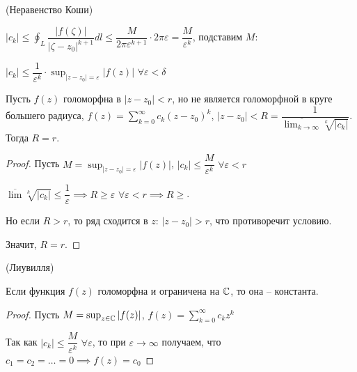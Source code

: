\begin{corollary}
    (Неравенство Коши)

    $|c_k| \leq \oint_{L} \dfrac{|f(\zeta)|}{|\zeta - z_0|^{k + 1}} dl \leq \dfrac{M}{2\pi\varepsilon^{k+1}} \cdot 2\pi\varepsilon = \dfrac{M}{\varepsilon^{k}}$, подставим $M$:

    $|c_k| \leq \dfrac{1}{\varepsilon^{k}} \cdot \sup_{|z - z_0| = \varepsilon} |f(z)|$  $\forall \varepsilon < \delta$
\end{corollary}

\begin{theorem*}
    Пусть $f(z)$ голоморфна в $|z - z_0| < r$, но не является голоморфной в круге большего радиуса, $f(z) = \sum_{k=0}^{\infty} c_k(z - z_0)^k$, $|z - z_0| < R = \dfrac{1}{\overline{\lim_{k \to \infty}} \sqrt[k]{|c_k|}}$. Тогда $R = r$.
\end{theorem*}

\begin{proof}
    Пусть $M = \sup_{|z - z_0| = \varepsilon} |f(z)|$, $|c_k| \leq \dfrac{M}{\varepsilon^{k}}$  $\forall \varepsilon < r$

    $\overline{\lim}\sqrt[k]{|c_k|} \leq \dfrac{1}{\varepsilon} \implies R \geq \varepsilon$  $\forall \varepsilon < r \implies R \geq$.

    Но если $R > r$, то ряд сходится в $z$: $|z - z_0| > r$, что противоречит условию.

    Значит, $R = r$.
\end{proof}

\begin{theorem*}
    (Лиувилля)

    Если функция $f(z)$ голоморфна и ограничена на $\mathbb{C}$, то она -- константа.
\end{theorem*}

\begin{proof}
    Пусть $M = \sup_{z \in \mathbb{C}} |f(z)|$, $f(z) = \sum_{k=0}^{\infty} c_k z^{k}$

    Так как $|c_k| \leq \dfrac{M}{\varepsilon^{k}}$  $\forall \varepsilon$, то при $\varepsilon \to \infty$ получаем, что $c_1 = c_2 = \dots = 0 \implies f(z) = c_0$ 
\end{proof}
